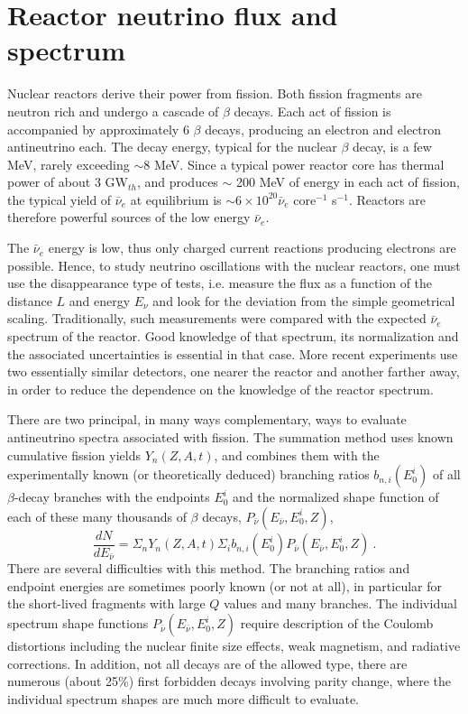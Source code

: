 \section{Reactor neutrino flux and spectrum} 
\label{sec:flux}

Nuclear reactors derive their power from fission. Both fission fragments are neutron rich and undergo a cascade of $\beta$ decays. Each act of fission
is accompanied by approximately 6 $\beta$ decays, producing an electron and electron antineutrino each. The decay energy, typical for the nuclear
$\beta$ decay, is a few MeV, rarely exceeding $\sim$8 MeV. Since a typical power reactor core has thermal power of about 3 GW$_{th}$, and produces
$\sim$ 200 MeV of energy in each act of fission, the typical yield of $\bar{\nu}_e$ at equilibrium is $\sim 6 \times 10^{20} \bar{\nu}_e$ core$^{-1}$ s$^{-1}$.   
Reactors are therefore powerful sources of the low energy $\bar{\nu}_e$.

The $\bar{\nu}_e$ energy is low, thus  only charged current reactions producing electrons are possible. Hence, to study neutrino oscillations with
the nuclear reactors, one must use the disappearance type of tests, i.e. measure the flux as a function of the distance $L$ and energy $E_{\nu}$ and
look for the deviation from the simple geometrical scaling. Traditionally, such measurements were compared with the expected  $\bar{\nu}_e$ spectrum
of the reactor. Good knowledge of that spectrum, its normalization and the associated uncertainties is essential in that case.  More recent experiments
\cite{Dayabay,Reno} use two essentially similar detectors, one nearer the reactor and another farther away, in order to reduce the dependence on the
knowledge of the reactor spectrum.

There are two principal, in many ways complementary, ways to evaluate antineutrino spectra associated with fission. 
 The summation method uses known cumulative fission yields $Y_n (Z,A,t)$, and combines them
 with the experimentally known (or theoretically deduced) branching ratios $b_{n,i}(E^i_0)$ of all $\beta$-decay branches with the endpoints $E^i_0$ and the
 normalized shape function of each of these many thousands of $\beta$ decays, $P_{\bar{\nu}} (E_{\bar{\nu}},E^i_0,Z)$,
 \begin{equation}
 \frac{dN}{dE_{\bar{\nu}}} = \Sigma_n Y_n (Z,A,t) \Sigma_i b_{n,i}(E^i_0) P_{\bar{\nu}} (E_{\bar{\nu}},E^i_0,Z) ~.
 \end{equation}
 There are several difficulties with this method. The branching ratios and endpoint energies are sometimes poorly known (or not at all), in particular for
 the short-lived fragments with large $Q$ values and many branches. The individual spectrum shape functions $P_{\bar{\nu}} (E_{\bar{\nu}},E^i_0,Z)$
 require description of the Coulomb distortions including the nuclear finite size effects, weak magnetism, and radiative corrections. In addition, not all
 decays are of the allowed type, there are numerous (about 25\%) first forbidden decays involving parity change, where the individual spectrum 
 shapes are much more difficult to evaluate. 
 
